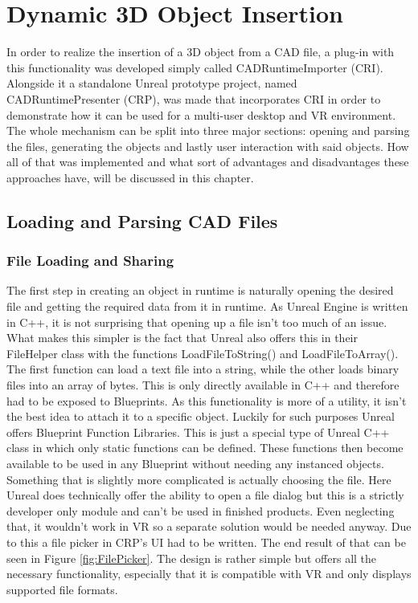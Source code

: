 \chapter{Dynamic 3D Object Insertion}\label{chp:ObjectLoading}

In order to realize the insertion of a 3D object from a \acs{CAD} file, a plug-in with this functionality was developed simply called CADRuntimeImporter (\acs{CRI}). Alongside it a standalone Unreal prototype project, named CADRuntimePresenter (\acs{CRP}), was made that incorporates \acs{CRI} in order to demonstrate how it can be used for a multi-user desktop and VR environment. The whole mechanism can be split into three major sections: opening and parsing the files, generating the objects and lastly user interaction with said objects. How all of that was implemented and what sort of advantages and disadvantages these approaches have, will be discussed in this chapter.
\section{Loading and Parsing CAD Files}
\subsection{File Loading and Sharing}
The first step in creating an object in runtime is naturally opening the desired file and getting the required data from it in runtime. As Unreal Engine is written in C++, it is not surprising that opening up a file isn't too much of an issue. What makes this simpler is the fact that Unreal also offers this in their FileHelper class with the functions LoadFileToString() and LoadFileToArray(). The first function can load a text file into a string, while the other loads binary files into an array of bytes. This is only directly available in C++ and therefore had to be exposed to Blueprints. As this functionality is more of a utility, it isn't the best idea to attach it to a specific object. Luckily for such purposes Unreal offers Blueprint Function Libraries\cite{bib:UEBFL}. This is just a special type of Unreal C++ class in which only static functions can be defined. These functions then become available to be used in any Blueprint without needing any instanced objects.\\
Something that is slightly more complicated is actually choosing the file. Here Unreal does technically offer the ability to open a file dialog but this is a strictly developer only module and can't be used in finished products\cite{bib:DeskPlat}. Even neglecting that, it wouldn't work in VR so a separate solution would be needed anyway. Due to this a file picker in CRP's UI had to be written. The end result of that can be seen in Figure \ref{fig:FilePicker}. The design is rather simple but offers all the necessary functionality, especially that it is compatible with VR and only displays supported file formats.\\

